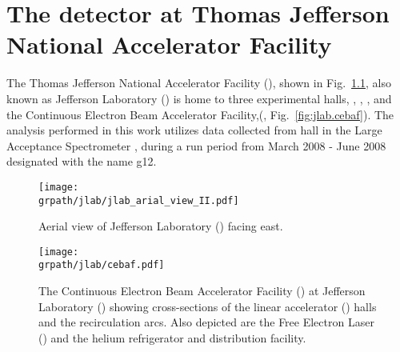 \setcounter{chapter}{0}
\graphicspath{{/Users/Mike/phdthesis/MY_THESIS}}
\chapter{\label{sec:clas}The  detector at Thomas Jefferson National Accelerator Facility }

The Thomas Jefferson National Accelerator Facility (\label{abbr:tjnaf}), shown in Fig.~\ref{fig:jlab.aerial}, also known as Jefferson Laboratory (\label{abbr:jlab}) is home to three experimental halls, , , , and the Continuous Electron Beam Accelerator Facility,\cite{cebaf}(\label{abbr:cebaf}, Fig.~\ref{fig:jlab.cebaf}).
%
The analysis performed in this work utilizes data collected from hall  in the  Large Acceptance Spectrometer , during a run period from March 2008 - June 2008 designated with the name g12.

\begin{figure}\begin{center}
\texttt{[image: \\grpath/jlab/jlab\_arial\_view\_II.pdf]}
\caption[ Aerial View (photograph)]{\label{fig:jlab.aerial}\cite{cebaf_flckr}Aerial view of Jefferson Laboratory () facing east.}
\end{center}\end{figure}

\begin{figure}\begin{center}
\texttt{[image: \\grpath/jlab/cebaf.pdf]}
\caption[ Facility]{\label{fig:jlab.cebaf}The Continuous Electron Beam Accelerator Facility\cite{cebaf} () at Jefferson Laboratory () showing cross-sections of the linear accelerator () halls and the recirculation arcs. Also depicted are the Free Electron Laser (\label{abbr:fel}) and the helium refrigerator and distribution facility.}
\end{center}\end{figure}

